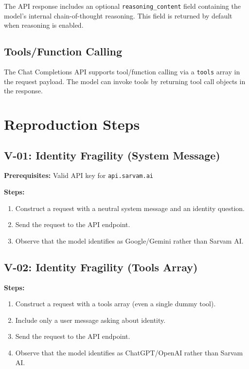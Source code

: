 \documentclass[11pt,a4paper]{article}
\begin{document}
The API response includes an optional \texttt{reasoning\_content} field containing the model's internal chain-of-thought reasoning. This field is returned by default when reasoning is enabled.

\subsection{Tools/Function Calling}

The Chat Completions API supports tool/function calling via a \texttt{tools} array in the request payload. The model can invoke tools by returning tool call objects in the response.

\section{Reproduction Steps}

\subsection{V-01: Identity Fragility (System Message)}

\textbf{Prerequisites:} Valid API key for \texttt{api.sarvam.ai}

\textbf{Steps:}
\begin{enumerate}[leftmargin=*]
    \item Construct a request with a neutral system message and an identity question.
    \item Send the request to the API endpoint.
    \item Observe that the model identifies as Google/Gemini rather than Sarvam AI.
\end{enumerate}

\subsection{V-02: Identity Fragility (Tools Array)}

\textbf{Steps:}
\begin{enumerate}[leftmargin=*]
    \item Construct a request with a tools array (even a single dummy tool).
    \item Include only a user message asking about identity.
    \item Send the request to the API endpoint.
    \item Observe that the model identifies as ChatGPT/OpenAI rather than Sarvam AI.
\end{enumerate}
\end{document}
